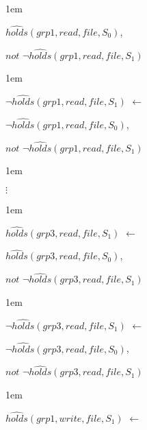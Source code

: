 \documentclass[global,twocolumn,final]{svjour}
\newenvironment{vquote}
  {\begin{list}{}{\leftmargin 1em}\item[]}
  {\end{list}}
\begin{document}
\begin{enumerate}
\begin{vquote}
           \hspace{1em}
           $\hat{holds}(grp1, read, file, S_{0})$,

           \hspace{1em}
           $not$ $\lnot\hat{holds}(grp1, read, file, S_{1})$
         \end{vquote}

         \begin{vquote}
           $\lnot\hat{holds}(grp1, read, file, S_{1})$ $\leftarrow$

           \hspace{1em}
           $\lnot\hat{holds}(grp1, read, file, S_{0})$,

           \hspace{1em}
           $not$ $\lnot\hat{holds}(grp1, read, file, S_{1})$
         \end{vquote}

         \begin{vquote}
           \hspace{2em}$\vdots$
         \end{vquote}

         \begin{vquote}
           $\hat{holds}(grp3, read, file, S_{1})$ $\leftarrow$

           \hspace{1em}
           $\hat{holds}(grp3, read, file, S_{0})$,

           \hspace{1em}
           $not$ $\lnot\hat{holds}(grp3, read, file, S_{1})$
         \end{vquote}

         \begin{vquote}
           $\lnot\hat{holds}(grp3, read, file, S_{1})$ $\leftarrow$

           \hspace{1em}
           $\lnot\hat{holds}(grp3, read, file, S_{0})$,

           \hspace{1em}
           $not$ $\lnot\hat{holds}(grp3, read, file, S_{1})$
         \end{vquote}

         \begin{vquote}
           $\hat{holds}(grp1, write, file, S_{1})$ $\leftarrow$


\end{vquote}
\end{enumerate}
\end{document}
